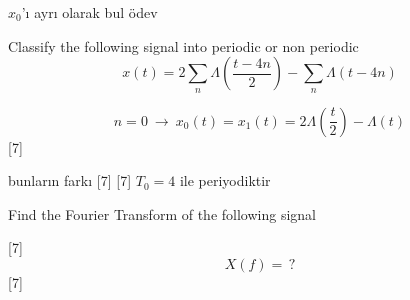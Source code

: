 \documentclass[11pt,a4paper]{article}
\begin{document}
$x_0$'ı ayrı olarak bul ödev

\begin{ornek}
  Classify the following signal into periodic or non periodic
  \[ x(t)=2\sum_{n}\Lambda\!\left(\frac{t-4n}{2}\right)-\sum_{n}\Lambda(t-4n) \]
\end{ornek}
\[ n=0\ \to\ x_0(t)=x_1(t)=2\Lambda\!\left(\frac{t}{2}\right)-\Lambda(t) \]
[7]

bunların farkı
[7]
[7]
\textcolor{kirmizikalem}{$T_0=4$ ile periyodiktir}

\begin{ornek}
  Find the Fourier Transform of the following signal
\end{ornek}
[7]
\[ X(f)=\,? \]
[7]
\end{document}
